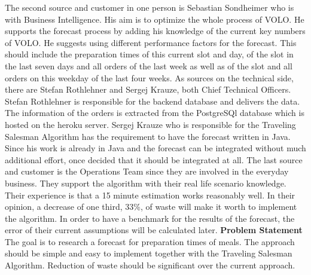 The second source and customer in one person is Sebastian Sondheimer who is with Business Intelligence. His aim is to optimize the whole process of VOLO. He supports the forecast process by adding his knowledge of the current key numbers of VOLO. He suggests using different performance factors for the forecast. This should include the preparation times of this current slot and day, of the slot in the last seven days and all orders of the last week as well as of the slot and all orders on this weekday of the last four weeks.\newline
As sources on the technical side, there are Stefan Rothlehner and Sergej Krauze, both Chief Technical Officers. Stefan Rothlehner is responsible for the backend database and delivers the data. The information of the orders is extracted from the PostgreSQl database which is hosted on the heroku server. Sergej Krauze who is responsible for the Traveling Salesman Algorithm has the requirement to have the forecast written in Java. Since his work is already in Java and the forecast can be integrated without much additional effort, once decided that it should be integrated at all.\newline
The last source and customer is the Operations Team since they are involved in the everyday business. They support the algorithm with their real life scenario knowledge. Their experience is that a 15 minute estimation works reasonably well. In their opinion, a decrease of one third, 33\%, of waste will make it worth to implement the algorithm. In order to have a benchmark for the results of the forecast, the error of their current assumptions will be calculated later.
\newline\newline\textbf{Problem Statement}\newline
The goal is to research a forecast for preparation times of meals. The approach should be simple and easy to implement together with the Traveling Salesman Algorithm. Reduction of waste should be significant over the current approach.
